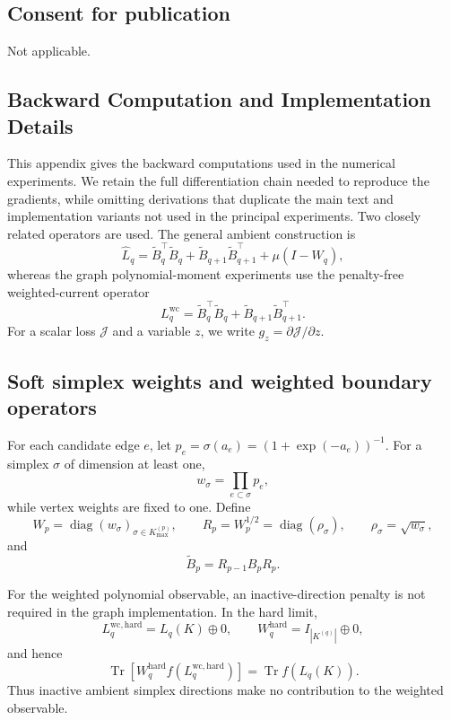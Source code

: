 \documentclass[pdflatex,sn-mathphys-num]{sn-jnl}%
\theoremstyle{thmstyleone}%
\theoremstyle{thmstyletwo}%
\theoremstyle{thmstylethree}%
\begin{document}
\subsection*{Consent for publication}
Not applicable.








\begin{appendices}

\section{Backward Computation and Implementation Details}
\label{app:backward}

This appendix gives the backward computations used in the numerical experiments. We retain the full differentiation chain needed to reproduce the gradients, while omitting derivations that duplicate the main text and implementation variants not used in the principal experiments. Two closely related operators are used. The general ambient construction is
\[
\widehat L_q
=
\widetilde B_q^\top\widetilde B_q
+
\widetilde B_{q+1}\widetilde B_{q+1}^\top
+
\mu(I-W_q),
\]
whereas the graph polynomial-moment experiments use the penalty-free weighted-current operator
\[
L_q^{\mathrm{wc}}
=
\widetilde B_q^\top\widetilde B_q
+
\widetilde B_{q+1}\widetilde B_{q+1}^\top.
\]
For a scalar loss \(\mathcal J\) and a variable \(z\), we write
\(g_z=\partial\mathcal J/\partial z\).

\subsection{Soft simplex weights and weighted boundary operators}

For each candidate edge \(e\), let
\(p_e=\sigma(a_e)=(1+\exp(-a_e))^{-1}\).
For a simplex \(\sigma\) of dimension at least one,
\[
w_\sigma=\prod_{e\subset\sigma}p_e,
\]
while vertex weights are fixed to one. Define
\[
W_p
=
\operatorname{diag}(w_\sigma)_{\sigma\in K_{\max}^{(p)}},
\qquad
R_p=W_p^{1/2}
=
\operatorname{diag}(\rho_\sigma),
\qquad
\rho_\sigma=\sqrt{w_\sigma},
\]
and
\[
\widetilde B_p=R_{p-1}B_pR_p.
\]

For the weighted polynomial observable, an inactive-direction penalty is not required in the graph implementation. In the hard limit,
\[
L_q^{\mathrm{wc,hard}}=L_q(K)\oplus 0,
\qquad
W_q^{\mathrm{hard}}=I_{|K^{(q)}|}\oplus 0,
\]
and hence
\[
\operatorname{Tr}\!\left[
W_q^{\mathrm{hard}}
f(L_q^{\mathrm{wc,hard}})
\right]
=
\operatorname{Tr}f(L_q(K)).
\]
Thus inactive ambient simplex directions make no contribution to the weighted observable.


\end{appendices}
\end{document}
